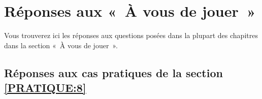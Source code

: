 

\chapter{Réponses aux «~À vous de jouer~»\label{annexe:reponses}}


Vous trouverez ici les réponses aux questions posées dans la plupart des chapitres dans la section «~À vous de jouer~». 

\section{Réponses aux cas pratiques de la section \ref{PRATIQUE:8}\label{REPONSES:8}}
